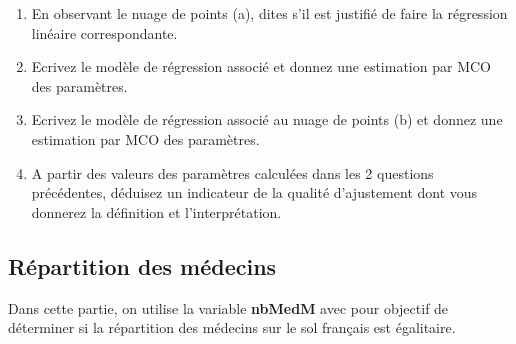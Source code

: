 \documentclass[a4paper,11pt]{article}
\begin{document}
\bigskip
\begin{enumerate}
\item  En observant le nuage de  points (a), dites s'il est justifié de faire la régression linéaire correspondante.


  \item Ecrivez le modèle de régression associé et donnez une estimation par MCO des paramètres.
  
  

  \item Ecrivez le modèle de régression associé  au nuage de points  (b) et donnez une estimation par MCO des paramètres.
  
  

  \item A partir des valeurs des paramètres calculées dans les 2 questions précédentes, déduisez un indicateur de la qualité d'ajustement dont vous donnerez la définition et l'interprétation.
  
  
\end{enumerate}

\subsection{Répartition des médecins}
\label{sec:concentration}

Dans cette partie, on utilise la variable \textbf{nbMedM} avec pour objectif de déterminer si la répartition des médecins sur le sol français est égalitaire.
\end{document}
